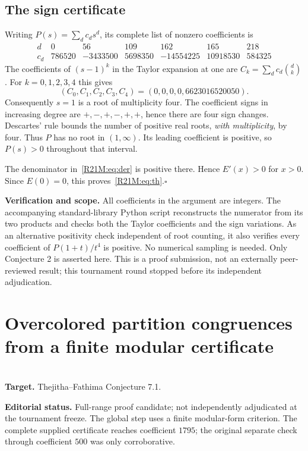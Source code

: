 \documentclass[11pt,a4paper]{article}
\begin{document}
\subsection*{The sign certificate}
Writing $P(s)=\sum_d c_ds^d$, its complete list of nonzero coefficients is
\[
\begin{array}{c|rrrrrr}
d &0&56&109&162&165&218\\ \hline
c_d&786520&-3433500&5698350&-14554225&10918530&584325
\end{array}
\]
The coefficients of $(s-1)^k$ in the Taylor expansion at one are
$C_k=\sum_d c_d\binom{d}{k}$. For $k=0,1,2,3,4$ this gives
\[
 (C_0,C_1,C_2,C_3,C_4)=(0,0,0,0,6623016520050).
\]
Consequently $s=1$ is a root of multiplicity four. The coefficient signs
in increasing degree are $+,-,+,-,+,+$, hence there are four sign changes.
Descartes' rule bounds the number of positive real roots,
\emph{with multiplicity}, by four. Thus $P$ has no root in $(1,\infty)$.
Its leading coefficient is positive, so $P(s)>0$ throughout that interval.

The denominator in~\eqref{R21M:eq:der} is positive there. Hence $E'(x)>0$
for $x>0$. Since $E(0)=0$, this proves~\eqref{R21M:eq:th}.\hfill$\square$

\textbf{Verification and scope.}
All coefficients in the argument are integers. The accompanying
standard-library Python script reconstructs the numerator from its two
products and checks both the Taylor coefficients and the sign variations.
As an alternative positivity check independent of root counting, it
also verifies every coefficient of $P(1+t)/t^4$ is positive.
No numerical sampling is needed. Only Conjecture 2 is asserted here.
This is a proof submission, not an externally peer-reviewed result;
this tournament round stopped before its independent adjudication.
\endgroup


\clearpage

\section{Overcolored partition congruences from a finite modular certificate}
\label{section:R21H}
\\[3pt]
\noindent\textbf{Target.} Thejitha--Fathima Conjecture 7.1.

\noindent\textbf{Editorial status.} Full-range proof candidate; not independently adjudicated at the tournament freeze. The global step uses a finite modular-form criterion. The complete supplied certificate reaches coefficient $1795$; the original separate check through coefficient $500$ was only corroborative.
\end{document}
